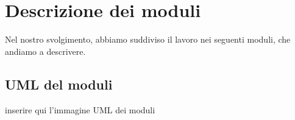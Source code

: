 \section{Descrizione dei moduli}
Nel nostro svolgimento, abbiamo suddiviso il lavoro nei seguenti moduli, che andiamo a descrivere.


\subsection{UML del moduli}
{\Large inserire qui l'immagine UML dei moduli}







